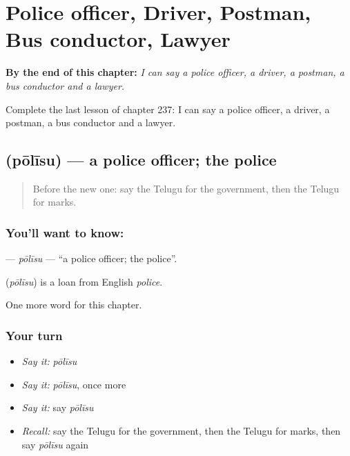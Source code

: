 
\chapter{Police officer, Driver, Postman, Bus conductor, Lawyer}
\label{ch:te-police-officer-driver-postman-bus-conductor-lawyer}

\begin{chapteropening}
\textbf{By the end of this chapter:} \emph{I can say a police officer, a driver, a postman, a bus conductor and a lawyer.}

Complete the last lesson of chapter 237: I can say a police officer, a driver, a postman, a bus conductor and a lawyer.
\end{chapteropening}

\section[\texorpdfstring{\te{పోలీసు} (pōlīsu)}{పోలీసు (pōlīsu)}]{ (pōlīsu) — a police officer; the police}

\label{lesson:TE-C237-polisu}



\begin{quote}
Before the new one: say the Telugu for the government, then the Telugu for marks.
\end{quote}

\subsection*{You'll want to know: }
\textbf{} — \emph{pōlīsu} — \textquotedblleft{}a police officer; the police\textquotedblright{}.

\begin{cousinweb}
\textbf{} (\emph{pōlīsu}) is a loan from English \emph{police}.
\end{cousinweb}

\begin{grammarlens}[title={What you've built}]
One more word for this chapter.
\end{grammarlens}

\subsection*{Your turn}
\begin{itemize}
\raggedright
  \item \emph{Say it:} \emph{pōlīsu}
  \item \emph{Say it:} \emph{pōlīsu}, once more
  \item \emph{Say it:} say \emph{pōlīsu}
  \item \emph{Recall:} say the Telugu for the government, then the Telugu for marks, then say \emph{pōlīsu} again
\end{itemize}

